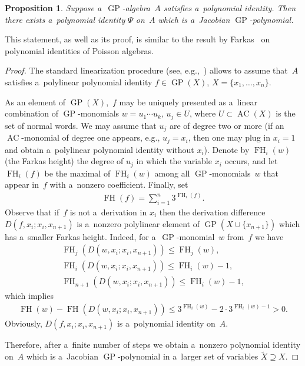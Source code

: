 \documentclass[11pt]{article}
\newtheorem{proposition}{Proposition}
\begin{document}
\begin{proposition}
\label{prop:GPIdent:Jacobian}
Suppose a~$\operatorname{GP}$-algebra~$A$ satisfies a~polynomial identity.
Then there exists a~polynomial identity $\Psi $ on~$A$ which is a~Jacobian $\operatorname{GP}$-polynomial.
\end{proposition}

This statement, as well as its proof, is similar to the result by Farkas~\cite{FarkasI} on polynomial identities of
Poisson algebras.

\begin{proof}
The standard linearization procedure (see, e.g.,~\cite[Chapter~1]{ZSSS}) allows to assume that~$A$ satisf\/ies
a~polylinear polynomial identity $f\in \operatorname{GP}(X)$, $X=\{x_1,\dots, x_n\}$.

As an element of $\operatorname{GP}(X)$,~$f$ may be uniquely presented as a~linear combination of $\operatorname{GP}$-monomials $w=u_1\cdots u_k $,
$u_j\in U$, where $U\subset \operatorname{AC}(X)$ is the set of normal words.
We may assume that $u_j$ are of degree two or more (if an $\operatorname{AC}$-monomial of degree one appears, e.g., $u_j=x_i$, then one
may plug in $x_i=1$ and obtain a~polylinear polynomial identity without $x_i$).
Denote by $\operatorname{FH}_i(w)$ (the Farkas height) the degree of $u_j$ in which the variable $x_i$ occurs, and let $\operatorname{FH}_i(f)$ be the
maximal of $\operatorname{FH}_i(w)$ among all $\operatorname{GP}$-monomials~$w$ that appear in~$f$ with a~nonzero coef\/f\/icient.
Finally, set
\begin{gather*}
\operatorname{FH}(f) = \sum\limits_{i=1}^n 3^{\operatorname{FH}_i(f)}.
\end{gather*}
Observe that if~$f$ is not a~derivation in $x_i$ then the derivation dif\/ference $ D(f, x_i; x_i, x_{n+1}) $ is a~nonzero
polylinear element of $\operatorname{GP}(X\cup\{x_{n+1}\})$ which has a~smaller Farkas height.
Indeed, for a~$\operatorname{GP}$-monomial~$w$ from~$f$ we have
\begin{gather*}
\operatorname{FH}_j(D(w,x_i;x_i,x_{n+1}))\le \operatorname{FH}_j(w),
\\
\operatorname{FH}_{i}(D(w,x_i;x_i,x_{n+1}))\le \operatorname{FH}_i(w)-1,
\\
\operatorname{FH}_{n+1}(D(w,x_i;x_i,x_{n+1}))\le \operatorname{FH}_i(w)-1,
\end{gather*}
which implies
\begin{gather*}
\operatorname{FH}(w)-\operatorname{FH}(D(w,x_i;x_i,x_{n+1})) \le 3^{\operatorname{FH}_i(w)} - 2\cdot 3^{\operatorname{FH}_i(w)-1} >0.
\end{gather*}
Obviously, $D(f, x_i; x_i, x_{n+1})$ is a~polynomial identity on~$A$.

Therefore, after a~f\/inite number of steps we obtain a~nonzero polynomial identity on~$A$ which is a~Jacobian
$\operatorname{GP}$-polynomial in a~larger set of variables $\widetilde X\supseteq X$.
\end{proof}
\end{document}
